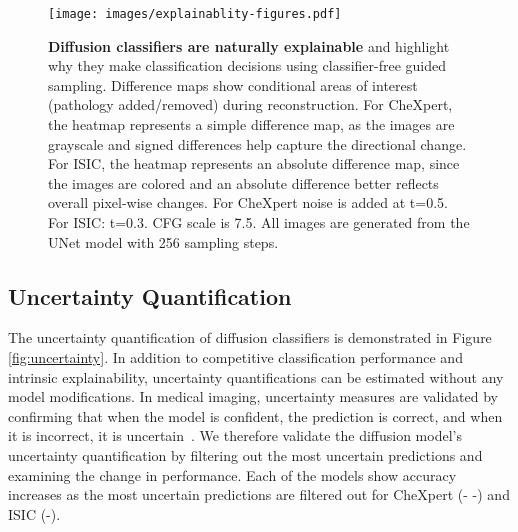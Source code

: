 \begin{figure}
    \centering
    \texttt{[image: images/explainablity-figures.pdf]}  %
    \caption{\textbf{Diffusion classifiers are naturally explainable} and highlight why they make classification decisions using classifier-free guided sampling. Difference maps show conditional areas of interest (pathology added/removed) during reconstruction. For CheXpert, the heatmap represents a simple difference map, as the images are grayscale and signed differences help capture the directional change. For ISIC, the heatmap represents an absolute difference map, since the images are colored and an absolute difference better reflects overall pixel-wise changes. For CheXpert noise is added at t=0.5. For ISIC: t=0.3. CFG scale is 7.5. All images are generated from the UNet model with 256 sampling steps. }
    \label{fig:interpretability}
\end{figure}

\subsection{Uncertainty Quantification}
The uncertainty quantification of diffusion classifiers is demonstrated in Figure \ref{fig:uncertainty}. In addition to competitive classification performance and intrinsic explainability, uncertainty quantifications can be estimated without any model modifications. In medical imaging, uncertainty measures are validated by confirming that when the model is confident, the prediction is correct, and when it is incorrect, it is uncertain~\cite{NAIR2020101557}. 
We therefore validate the diffusion model's uncertainty quantification by filtering out the most uncertain predictions and examining the change in performance.
Each of the models show accuracy increases as the most uncertain predictions are filtered out for CheXpert (- -) and ISIC (-). %

